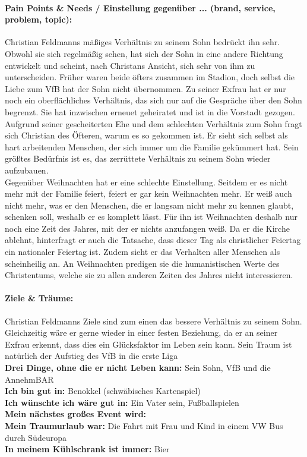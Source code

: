 \paragraph{Pain Points & Needs / Einstellung gegenüber ... (brand, service, problem, topic):}
Christian Feldmanns mäßiges Verhältnis zu seinem Sohn bedrückt ihn sehr. Obwohl sie sich regelmäßig sehen, hat sich der Sohn in eine andere Richtung entwickelt und scheint, nach Christans Ansicht, sich sehr von ihm zu unterscheiden. Früher waren beide öfters zusammen im Stadion, doch selbst die Liebe zum VfB hat der Sohn nicht übernommen. Zu seiner Exfrau hat er nur noch ein oberflächliches Verhältnis, das sich nur auf die Gespräche über den Sohn begrenzt. Sie hat inzwischen erneuet geheiratet und ist in die Vorstadt gezogen. Aufgrund seiner gescheiterten Ehe und dem schlechten Verhältnis zum Sohn fragt sich Christian des Öfteren, warum es so gekommen ist. Er sieht sich selbst als hart arbeitenden Menschen, der sich immer um die Familie gekümmert hat. Sein größtes Bedürfnis ist es, das zerrüttete Verhältnis zu seinem Sohn wieder aufzubauen.\\
Gegenüber Weihnachten hat er eine schlechte Einstellung. Seitdem er es nicht mehr mit der Familie feiert, feiert er gar kein Weihnachten mehr. Er weiß auch nicht mehr, was er den Menschen, die er langsam nicht mehr zu kennen glaubt, schenken soll, weshalb er es komplett lässt. Für ihn ist Weihnachten deshalb nur noch eine Zeit des Jahres, mit der er nichts anzufangen weiß. Da er die Kirche ablehnt, hinterfragt er auch die Tatsache, dass dieser Tag als christlicher Feiertag ein nationaler Feiertag ist. Zudem sieht er das Verhalten aller Menschen als scheinheilig an. An Weihnachten predigen sie die humanistischen Werte des Christentums, welche sie zu allen anderen Zeiten des Jahres nicht interessieren.\\
\hline
\paragraph{Ziele & Träume:}
Christian Feldmanns Ziele sind zum einen das bessere Verhältnis zu seinem Sohn. Gleichzeitig wäre er gerne wieder in einer festen Beziehung, da er an seiner Exfrau erkennt, dass dies ein Glücksfaktor im Leben sein kann. Sein Traum ist natürlich der Aufstieg des VfB in die erste Liga\\
\hline
\vspace*{0.1in}
\textbf{Drei Dinge, ohne die er nicht Leben kann:} Sein Sohn, VfB und die AnnehmBAR\\
\textbf{Ich bin gut in:} Benokkel (schwäbisches Kartenspiel) \\
\textbf{Ich wünschte ich wäre gut in:} Ein Vater sein, Fußballspielen \\
\textbf{Mein nächstes großes Event wird:}  \\
\textbf{Mein Traumurlaub war:} Die Fahrt mit Frau und Kind in einem VW Bus durch Südeuropa \\
\textbf{In meinem Kühlschrank ist immer:} Bier \\
\hline


